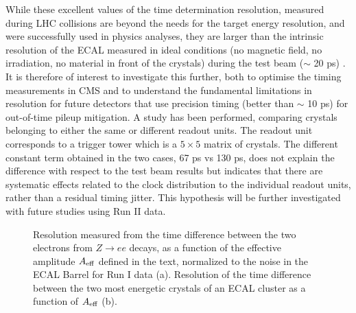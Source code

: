 \documentclass[journal]{IEEEtran}
\begin{document}
While these excellent values of the time determination resolution, measured during LHC collisions are beyond the needs for the target energy resolution, and were successfully used in physics analyses, they are larger than the intrinsic resolution of the ECAL measured in ideal conditions (no magnetic field, no irradiation, no material in front of the crystals) during the test beam ($\sim$ 20 ps) \cite{Chatrchyan:2009aj}. It is therefore of interest to investigate this further, both to optimise the timing measurements in CMS and to understand the fundamental limitations in resolution for future detectors that use precision timing (better than $\sim$ 10 ps) for out-of-time pileup mitigation. A study has been performed, comparing crystals belonging to either the same or different readout units. The readout unit corresponds to a trigger tower which is a $5 \times 5$ matrix of crystals.  The different constant term obtained in the two cases, 67 ps vs 130 ps, does not explain the difference with respect to the test beam results but indicates that there are systematic effects related to the clock distribution to the individual readout units, rather than a residual timing jitter. This hypothesis will be further investigated with future studies using Run II data.
%
\begin{figure}[!t]
  \begin{center}
    \caption{Resolution measured from the time difference between the two electrons from $Z\to ee$ decays, as a function of the effective amplitude $A_{\rm eff}$ defined in the text, normalized to the noise in the ECAL Barrel for Run I data (a). Resolution of the time difference between the two most energetic crystals of an ECAL cluster as a function of $A_{\rm eff}$ (b). \label{fig:time_resol}}
  \end{center}
\end{figure}
%
\end{document}
